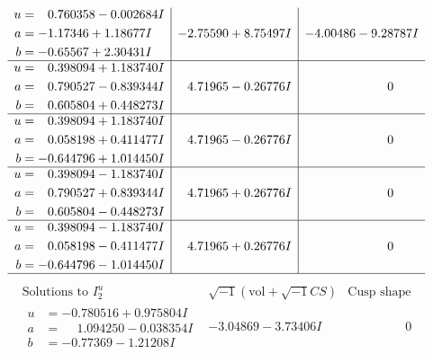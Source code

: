 \documentclass[1p]{elsarticle_modified}
\theoremstyle{definition}
\newcommand{\I}{\sqrt{-1}}
\begin{document}
$$\begin{array}{c|c|c}
\begin{aligned}
u &= \phantom{-}0.760358 - 0.002684 I \\
a &= -1.17346 + 1.18677 I \\
b &= -0.65567 + 2.30431 I\end{aligned}
 & -2.75590 + 8.75497 I & -4.00486 - 9.28787 I \\ \hline\begin{aligned}
u &= \phantom{-}0.398094 + 1.183740 I \\
a &= \phantom{-}0.790527 - 0.839344 I \\
b &= \phantom{-}0.605804 + 0.448273 I\end{aligned}
 & \phantom{-}4.71965 - 0.26776 I & \phantom{-0.000000 } 0 \\ \hline\begin{aligned}
u &= \phantom{-}0.398094 + 1.183740 I \\
a &= \phantom{-}0.058198 + 0.411477 I \\
b &= -0.644796 + 1.014450 I\end{aligned}
 & \phantom{-}4.71965 - 0.26776 I & \phantom{-0.000000 } 0 \\ \hline\begin{aligned}
u &= \phantom{-}0.398094 - 1.183740 I \\
a &= \phantom{-}0.790527 + 0.839344 I \\
b &= \phantom{-}0.605804 - 0.448273 I\end{aligned}
 & \phantom{-}4.71965 + 0.26776 I & \phantom{-0.000000 } 0 \\ \hline\begin{aligned}
u &= \phantom{-}0.398094 - 1.183740 I \\
a &= \phantom{-}0.058198 - 0.411477 I \\
b &= -0.644796 - 1.014450 I\end{aligned}
 & \phantom{-}4.71965 + 0.26776 I & \phantom{-0.000000 } 0\\
 \hline 
 \end{array}$$\newpage$$\begin{array}{c|c|c}  
\text{Solutions to }I^u_{2}& \I (\text{vol} + \sqrt{-1}CS) & \text{Cusp shape}\\
 \hline 
\begin{aligned}
u &= -0.780516 + 0.975804 I \\
a &= \phantom{-}1.094250 - 0.038354 I \\
b &= -0.77369 - 1.21208 I\end{aligned}
 & -3.04869 - 3.73406 I & \phantom{-0.000000 } 0 \\ \hline\begin{aligned}

\end{aligned}
\end{array}$$
\end{document}
